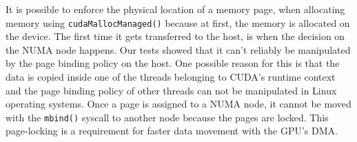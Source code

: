 It is possible to enforce the physical location of a memory page, when allocating memory using
\verb|cudaMallocManaged()| because at first, the memory is allocated on the device. The first time it
gets transferred to the host, is when the decision on the NUMA node happens. Our tests showed that it can't reliably be manipulated by the page binding policy on the host. One possible reason for this is that the
data is copied inside one of the threads belonging to CUDA's runtime context and the page binding policy of 
other threads can not be manipulated in Linux operating systems. Once a page is assigned to a NUMA node, it cannot be moved with the \verb|mbind()| syscall to another node because the pages are locked. This page-locking is a requirement for faster data movement with the GPU's DMA. \cite{CUDA:Toolkit}




